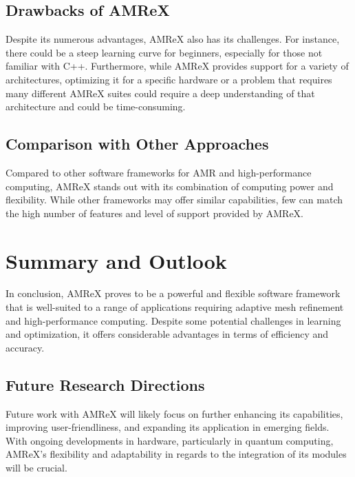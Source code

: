 \documentclass[12pt, a4paper]{scrartcl}
\begin{document}
\subsection{Drawbacks of AMReX}

Despite its numerous advantages, AMReX also has its challenges. For instance, there 
could be a steep learning curve for beginners, especially for those not familiar 
with C++. Furthermore, while AMReX provides support for a variety of architectures, optimizing 
it for a specific hardware or a problem that requires many different AMReX suites could require a deep understanding of that architecture and 
could be time-consuming.

\subsection{Comparison with Other Approaches}

Compared to other software frameworks for AMR and high-performance computing, AMReX 
stands out with its combination of computing power and flexibility. While other frameworks 
may offer similar capabilities, few can match the high number of features and level 
of support provided by AMReX.

\section{Summary and Outlook}

In conclusion, AMReX proves to be a powerful and flexible software framework that 
is well-suited to a range of applications requiring adaptive mesh refinement and 
high-performance computing. Despite some potential challenges in learning and 
optimization, it offers considerable advantages in terms of efficiency and accuracy.

\subsection{Future Research Directions}

Future work with AMReX will likely focus on further enhancing its capabilities, improving 
user-friendliness, and expanding its application in emerging fields. With ongoing developments 
in hardware, particularly in quantum computing, AMReX's flexibility and 
adaptability in regards to the integration of its modules will be crucial.
\end{document}
